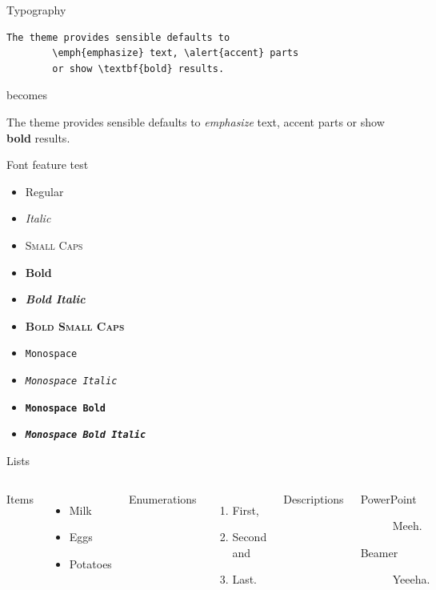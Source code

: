 \begin{frame}[fragile]{Typography}
	\begin{verbatim}The theme provides sensible defaults to
		\emph{emphasize} text, \alert{accent} parts
		or show \textbf{bold} results.\end{verbatim}
	
	\begin{center}becomes\end{center}
	
	The theme provides sensible defaults to \emph{emphasize} text,
	\alert{accent} parts or show \textbf{bold} results.
\end{frame}

\begin{frame}{Font feature test}
	\begin{itemize}
		\item Regular
		\item \textit{Italic}
		\item \textsc{Small Caps}
		\item \textbf{Bold}
		\item \textbf{\textit{Bold Italic}}
		\item \textbf{\textsc{Bold Small Caps}}
		\item \texttt{Monospace}
		\item \texttt{\textit{Monospace Italic}}
		\item \texttt{\textbf{Monospace Bold}}
		\item \texttt{\textbf{\textit{Monospace Bold Italic}}}
	\end{itemize}
\end{frame}

\begin{frame}{Lists}
	\begin{columns}[T,onlytextwidth]
		Items
		\begin{itemize}
			\item Milk \item Eggs \item Potatoes
		\end{itemize}
		
		Enumerations
		\begin{enumerate}
			\item First, \item Second and \item Last.
		\end{enumerate}
		
		Descriptions
		\begin{description}
			\item[PowerPoint] Meeh. \item[Beamer] Yeeeha.
		\end{description}
	\end{columns}
\end{frame}

